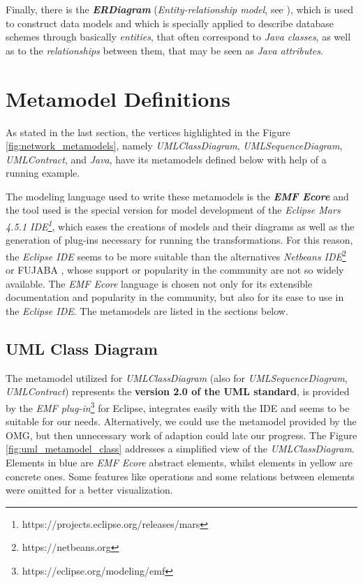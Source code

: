 \documentclass[tuberlin,cic,tc,english,noabntcite,oneside]{iiufrgs}
\begin{document}
Finally, there is the \textbf{\emph{ERDiagram}} (\emph{Entity-relationship model}, see \citealp{chen1976entity}), which is used to construct data models and which is specially applied to describe database schemes through basically \emph{entities}, that often correspond to \emph{Java classes}, as well as to the \emph{relationships} between them, that may be seen as \emph{Java attributes}.

\section{Metamodel Definitions}
\label{sec:MetamodelDefinitions}
As stated in the last section, the vertices highlighted in the Figure \ref{fig:network_metamodels}, namely \emph{UMLClassDiagram}, \emph{UMLSequenceDiagram}, \emph{UMLContract}, and \emph{Java}, have its metamodels defined below with help of a running example.

The modeling language used to write these metamodels is the \textbf{\emph{EMF Ecore}} and the tool used is the special version for model development of the \emph{Eclipse Mars 4.5.1 IDE\footnote{https://projects.eclipse.org/releases/mars}}, which eases the creations of models and their diagrams as well as the generation of plug-ins necessary for running the transformations. For this reason, the \emph{Eclipse IDE} seems to be more suitable than the alternatives \emph{Netbeans IDE}\footnote{https://netbeans.org} or FUJABA \citep{nickel2000fujaba}, whose support or popularity in the community are not so widely available. The \emph{EMF Ecore} language is chosen not only for its extensible documentation and popularity in the community, but also for its ease to use in the \emph{Eclipse IDE}. The metamodels are listed in the sections below.

\subsection{UML Class Diagram}
The metamodel utilized for \emph{UMLClassDiagram} (also for \emph{UMLSequenceDiagram}, \emph{UMLContract}) represents the \textbf{version 2.0 of the UML standard}, is provided by the \emph{EMF plug-in}\footnote{https://eclipse.org/modeling/emf} for Eclipse, integrates easily with the IDE and seems to be suitable for our needs. Alternatively, we could use the metamodel provided by the OMG, but then unnecessary work of adaption could late our progress. The Figure \ref{fig:uml_metamodel_class} addresses a simplified view of the \emph{UMLClassDiagram}. Elements in blue are \emph{EMF Ecore} abstract elements, whilst elements in yellow are concrete ones. Some features like operations and some relations between elements were omitted for a better visualization. 
\end{document}
